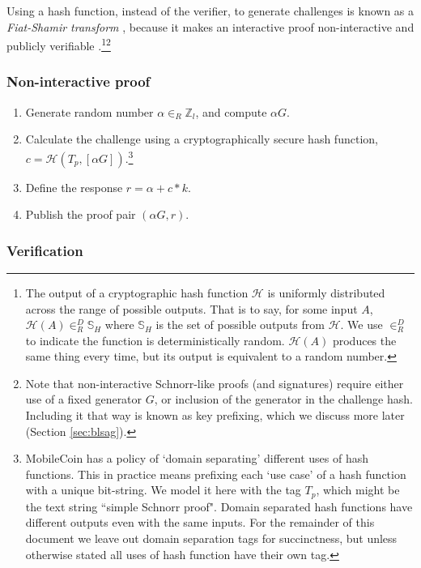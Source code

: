 Using a hash function, instead of the verifier, to generate challenges is known as a {\em Fiat-Shamir transform} \cite{fiat-shamir-transform}, because it makes an interactive proof non-interactive and publicly verifiable \cite{Signatures2015BorromeanRS}.\footnote{The output of a cryptographic hash function $\mathcal{H}$ is uniformly distributed across the range of possible outputs. That is to say, for some input $A$, $\mathcal{H}(A) \in^D_R \mathbb{S}_H$ where $\mathbb{S}_H$ is the set of possible outputs from $\mathcal{H}$. We use $\in^D_R$ to indicate the function is deterministically random. $\mathcal{H}(A)$ produces the same thing every time, but its output is equivalent to a random number.
}\footnote{Note that non-interactive Schnorr-like proofs (and signatures) require either use of a fixed generator $G$, or inclusion of the generator in the challenge hash. Including it that way is known as key prefixing, which we discuss more later (Section \ref{sec:blsag}).}%

\subsubsection*{Non-interactive proof}

\begin{enumerate}
	\item Generate random number $\alpha \in_R \mathbb{Z}_l$, and compute $\alpha G$.
	\item Calculate the challenge using a cryptographically secure hash function, \(c = \mathcal{H}(T_p, [\alpha G])\).\footnote{MobileCoin has a policy of `domain separating' \cite{domain-separation-context-labels} different uses of hash functions. This in practice means prefixing each `use case' of a hash function with a unique bit-string. We model it here with the tag $T_p$, which might be the text string ``simple Schnorr proof". Domain separated hash functions have different outputs even with the same inputs. For the remainder of this document we leave out domain separation tags for succinctness, but unless otherwise stated all uses of hash function have their own tag.}
	\item Define the response $r = \alpha + c*k$.
	\item Publish the proof pair $(\alpha G, r)$.
\end{enumerate}

\subsubsection*{Verification}

